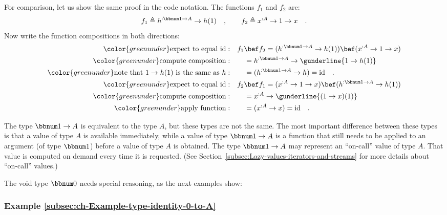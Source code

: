 For comparison, let us show the same proof in the code notation. The
functions $f_{1}$ and $f_{2}$ are:
\[
f_{1}\triangleq h^{:\bbnum 1\rightarrow A}\rightarrow h(1)\quad,\quad\quad f_{2}\triangleq x^{:A}\rightarrow1\rightarrow x\quad.
\]
Now write the function compositions in both directions:
\begin{align*}
{\color{greenunder}\text{expect to equal }\text{id}:}\quad & f_{1}\bef f_{2}=(h^{:\bbnum 1\rightarrow A}\rightarrow h(1))\bef(x^{:A}\rightarrow1\rightarrow x)\\
{\color{greenunder}\text{compute composition}:}\quad & \quad=h^{:\bbnum 1\rightarrow A}\rightarrow\gunderline{1\rightarrow h(1)}\\
{\color{greenunder}\text{note that }1\rightarrow h(1)\text{ is the same as }h:}\quad & \quad=(h^{:\bbnum 1\rightarrow A}\rightarrow h)=\text{id}\quad.\\
{\color{greenunder}\text{expect to equal }\text{id}:}\quad & f_{2}\bef f_{1}=(x^{:A}\rightarrow1\rightarrow x)\bef(h^{:\bbnum 1\rightarrow A}\rightarrow h(1))\\
{\color{greenunder}\text{compute composition}:}\quad & \quad=x^{:A}\rightarrow\gunderline{(1\rightarrow x)(1)}\\
{\color{greenunder}\text{apply function}:}\quad & \quad=(x^{:A}\rightarrow x)=\text{id}\quad.
\end{align*}

The type $\bbnum 1\rightarrow A$ is equivalent to the type $A$,
but these types are not the same. The most important difference between
these types is that a value of type $A$ is available immediately,
while a value of type $\bbnum 1\rightarrow A$ is a function that
still needs to be applied to an argument (of type $\bbnum 1$) before
a value of type $A$ is obtained. The type $\bbnum 1\rightarrow A$
may represent an \textsf{``}on-call\textsf{''} value of type
$A$. That value is computed on demand every time it is requested.
(See Section~\ref{subsec:Lazy-values-iterators-and-streams} for
more details about \textsf{``}on-call\textsf{''} values.)

The void type $\bbnum 0$ needs special reasoning,
as the next examples show:

\subsubsection{Example \label{subsec:ch-Example-type-identity-0-to-A}\ref{subsec:ch-Example-type-identity-0-to-A}}

